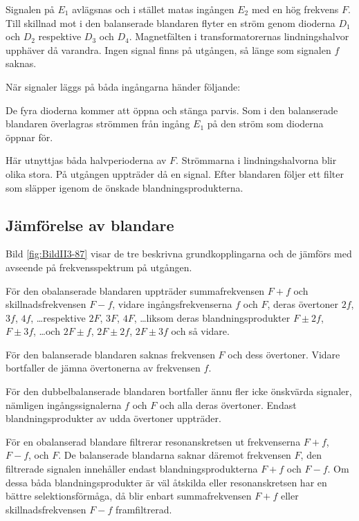 Signalen på \(E_1\) avlägsnas och i stället matas ingången \(E_2\) med
en hög frekvens \(F\).
Till skillnad mot i den balanserade blandaren flyter en ström genom dioderna
\(D_1\) och \(D_2\) respektive \(D_3\) och \(D_4\).
Magnetfälten i transformatorernas lindningshalvor upphäver då varandra.
Ingen signal finns på utgången, så länge som signalen \(f\) saknas.

När signaler läggs på båda ingångarna händer följande:

De fyra dioderna kommer att öppna och stänga parvis.
Som i den balanserade blandaren överlagras strömmen från ingång \(E_1\) på den
ström som dioderna öppnar för.

Här utnyttjas båda halvperioderna av \(F\).
Strömmarna i lindningshalvorna blir olika stora.
På utgången uppträder då en signal.
Efter blandaren följer ett filter som släpper igenom de önskade
blandningsprodukterna.

\clearpage
\subsection{Jämförelse av blandare}


Bild \ref{fig:BildII3-87} visar de tre beskrivna grundkopplingarna och de
jämförs med avseende på frekvensspektrum på utgången.

För den obalanserade blandaren uppträder summafrekvensen \(F + f\) och
skillnadsfrekvensen \(F - f\), vidare ingångsfrekvenserna \(f\) och \(F\),
deras övertoner \(2f\), \(3f\), \(4f\), \ldots respektive  \(2F\), \(3F\),
\(4F\), \ldots liksom deras blandningsprodukter \(F\pm 2f\), \(F\pm
3f\), \ldots och \(2F \pm f\), \(2F \pm 2f\), \(2F \pm 3f\) och så vidare.

För den balanserade blandaren saknas frekvensen \(F\) och dess övertoner.
Vidare bortfaller de jämna övertonerna av frekvensen \(f\).

För den dubbelbalanserade blandaren bortfaller ännu fler icke önskvärda
signaler, nämligen ingångssignalerna \(f\) och \(F\) och alla deras övertoner.
Endast blandningsprodukter av udda övertoner uppträder.

För en obalanserad blandare filtrerar resonanskretsen ut frekvenserna
\(F + f\), \(F - f\), och \(F\).
De balanserade blandarna saknar däremot frekvensen \(F\), den filtrerade
signalen innehåller endast blandningsprodukterna \(F + f\) och \(F - f\).
Om dessa båda blandningsprodukter är väl åtskilda eller resonanskretsen har en
bättre selektionsförmåga, då blir enbart summafrekvensen \(F + f\)
eller skillnadsfrekvensen \(F - f\) framfiltrerad.

